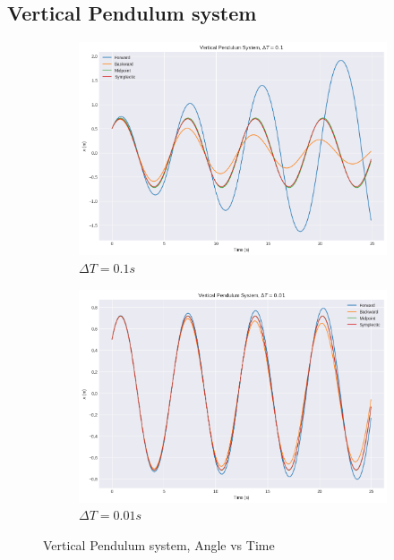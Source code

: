 \documentclass[11pt]{article}
\begin{document}
\subsection*{Vertical Pendulum system}
\begin{figure}[H]
    \centering
    \begin{subfigure}[H]{0.49\linewidth}
        \includegraphics[width=\linewidth]{../vp1.png}
        \caption*{$\Delta T = 0.1s$}
    \end{subfigure}
    \begin{subfigure}[H]{0.49\linewidth}
        \includegraphics[width=\linewidth]{../vp2.png}
        \caption*{$\Delta T = 0.01s$}
    \end{subfigure}
    \caption*{Vertical Pendulum system, Angle vs Time}
\end{figure}
\end{document}
